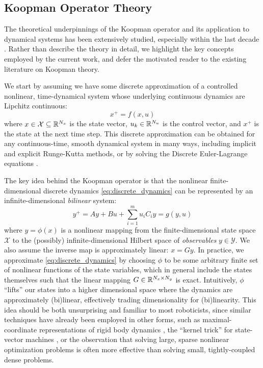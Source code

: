 \documentclass{article}
\begin{document}
\subsection{Koopman Operator Theory}
The theoretical underpinnings of the Koopman operator and its application to dynamical
systems has been extensively studied, especially within the last decade 
\cite{Fasel2021,Proctor2018,Bruder2021,Williams2015}. Rather than describe the theory in
detail, we highlight the key concepts employed by the current work, and defer the
motivated reader to the existing literature on Koopman theory.

We start by assuming we have some discrete approximation of a controlled nonlinear,
time-dynamical system whose underlying continuous dynamics are Lipchitz continuous:
\begin{equation} \label{eq:discrete_dynamics} 
  x^+ = f(x, u) 
\end{equation} 
where $x \in \mathcal{X} \subseteq \mathbb{R}^{N_x}$ is the state vector, $u_k \in \mathbb{R}^{N_u}$ is
the control vector, and $x^+$ is the state at the next time step. This discrete
approximation can be obtained for any continuous-time, smooth dynamical system in many
ways, including implicit and explicit Runge-Kutta methods, or by solving the Discrete
Euler-Lagrange equations \cite{Brudigam2021a,Brudigam2021,Howell2022}.

The key idea behind the Koopman operator is that the nonlinear finite-dimensional discrete
dynamics \eqref{eq:discrete_dynamics} can be represented by an infinite-dimensional
\textit{bilinear} system:
\begin{equation} \label{eq:bilinear_dynamics}
  y^+ = A y + B u + \sum_{i=1}^m u_i C_i y = g(y,u)
\end{equation}
where $y = \phi(x)$ is a nonlinear mapping from the finite-dimensional state space
$\mathcal{X}$ to the (possibly) infinite-dimensional Hilbert space of \textit{observables}
$y \in \mathcal{Y}$. We also assume the inverse map is approximately linear: $x = G y$. In
practice, we approximate \eqref{eq:discrete_dynamics} by choosing $\phi$ to be some
arbitrary finite set of nonlinear functions of the state variables, which in general
include the states themselves such that the linear mapping $G \in \mathbb{R}^{N_x \times N_y}$ is
exact.  Intuitively, $\phi$ ``lifts'' our states into a higher dimensional space where the
dynamics are approximately (bi)linear, effectively trading dimensionality for
(bi)linearity. This idea should be both unsurprising and familiar to most roboticists,
since similar techniques have already been employed in other forms, such as
maximal-coordinate representations of rigid body dynamics
\cite{Baraff,Brudigam2021a,Howell2022}, the
``kernel trick'' for state-vector machines \cite{Hofmann2006}, or the observation that
solving large, sparse nonlinear optimization problems is often more effective than solving
small, tightly-coupled dense problems.
\end{document}
